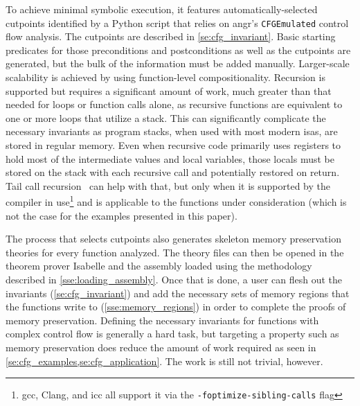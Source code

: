 To achieve minimal symbolic execution,
it features automatically-selected cutpoints
identified by a Python script that relies on
angr's \lstinline|CFGEmulated| control flow analysis.
The cutpoints are described in \cref{se:cfg_invariant}.
Basic starting predicates for those preconditions and postconditions
as well as the cutpoints are generated,
but the bulk of the information must be added manually.
Larger-scale scalability is achieved by using function-level compositionality.
Recursion is supported but requires a significant amount of work,
much greater than that needed for loops or function calls alone,
as recursive functions are equivalent to one or more loops that utilize a stack.
This can significantly complicate the necessary invariants
as program stacks, when used with most modern \acp{isa}, are stored in regular memory.
Even when recursive code primarily uses registers
to hold most of the intermediate values and local variables,
those locals must be stored on the stack with each recursive call
and potentially restored on return.
Tail call recursion~\citep{clinger1998tail} can help with that,
but only when it is supported by the compiler in use\footnote{%
  \acs{gcc}, Clang, and \acs{icc} all support it via the \texttt{-foptimize-sibling-calls} flag
} and is applicable to the functions under consideration
(which is not the case for the examples presented in this paper).

The process that selects cutpoints
also generates skeleton memory preservation theories for every function analyzed.
The theory files can then be opened in the theorem prover Isabelle
and the assembly loaded using the methodology described in \cref{sse:loading_assembly}.
Once that is done, a user can flesh out the invariants (\cref{se:cfg_invariant})
and add the necessary sets of memory regions
that the functions write to (\cref{sse:memory_regions})
in order to complete the proofs of memory preservation.
Defining the necessary invariants for functions with complex control flow
is generally a hard task,
but targeting a property such as memory preservation
does reduce the amount of work required
as seen in \cref{se:cfg_examples,se:cfg_application}.
The work is still not trivial, however.

